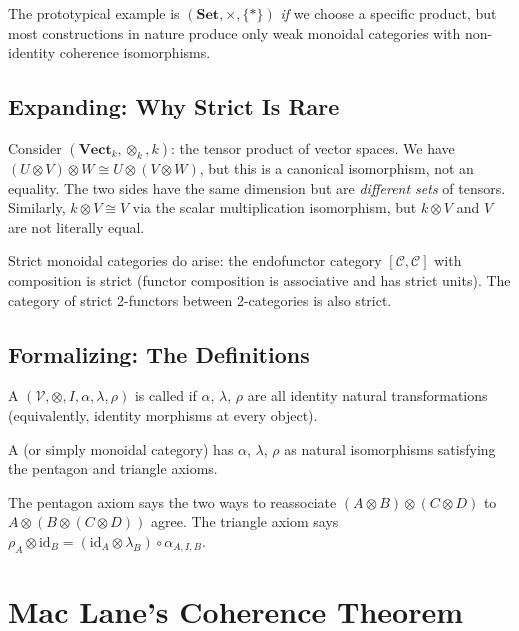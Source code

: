 The prototypical example is $(\mathbf{Set}, \times, \{*\})$ \emph{if} we choose
a specific product, but most constructions in nature produce only weak monoidal
categories with non-identity coherence isomorphisms.

\subsection{Expanding: Why Strict Is Rare}

Consider $(\mathbf{Vect}_k, \otimes_k, k)$: the tensor product of vector spaces.
We have $(U \otimes V) \otimes W \cong U \otimes (V \otimes W)$, but this is a
canonical isomorphism, not an equality. The two sides have the same dimension
but are \emph{different sets} of tensors. Similarly, $k \otimes V \cong V$ via
the scalar multiplication isomorphism, but $k \otimes V$ and $V$ are not
literally equal.

Strict monoidal categories do arise: the endofunctor category $[\mathcal{C},
\mathcal{C}]$ with composition is strict (functor composition is associative
and has strict units). The category of strict 2-functors between 2-categories
is also strict.

\subsection{Formalizing: The Definitions}

\begin{definition}
A  $(\mathcal{V}, \otimes, I, \alpha, \lambda, \rho)$
is called  if $\alpha$, $\lambda$, $\rho$ are all identity natural
transformations (equivalently, identity morphisms at every object).
\end{definition}

\begin{definition}
A  (or simply monoidal category) has $\alpha$,
$\lambda$, $\rho$ as natural isomorphisms satisfying the pentagon and triangle
axioms.
\end{definition}

The pentagon axiom says the two ways to reassociate $(A \otimes B) \otimes (C
\otimes D)$ to $A \otimes (B \otimes (C \otimes D))$ agree. The triangle axiom
says $\rho_A \otimes \mathrm{id}_B = (\mathrm{id}_A \otimes \lambda_B) \circ
\alpha_{A,I,B}$.


\section{Mac Lane's Coherence Theorem}
\label{sec:maclane-coherence}

